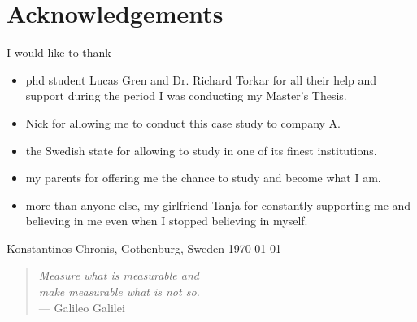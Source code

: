 \newpage
\clearpage
\mbox{}
\newpage
\clearpage
\thispagestyle{empty}
\section*{Acknowledgements}

I would like to thank
\begin{itemize}
	\item[] phd student Lucas Gren and Dr. Richard Torkar for all their help and support during the period I was conducting my Master's Thesis.
	\item[] Nick for allowing me to conduct this case study to company A.
	\item[] the Swedish state for allowing to study in one of its finest institutions.
	\item[] my parents for offering me the chance to study and become what I am. 
	\item[] more than anyone else, my girlfriend Tanja for constantly supporting me and believing in me even when I stopped believing in myself. \\[1cm]
\end{itemize}

\hfill Konstantinos Chronis, Gothenburg, Sweden \today

\newpage
\clearpage
\vspace*{\fill} 
\begin{quote} 
\centering 
{\Large \textit{Measure what is measurable and}} \\ 
{\Large \textit{make measurable what is not so.}} \\ 
\hspace{7cm} --- Galileo Galilei
\end{quote}
\vspace*{\fill}
\mbox{}

\newpage
\clearpage
\mbox{}

